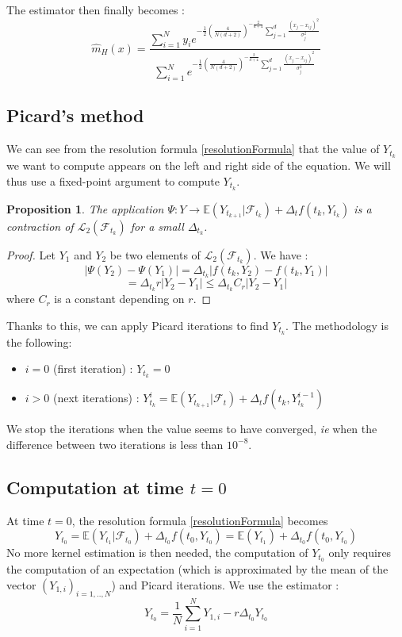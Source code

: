 \documentclass[a4paper,11pt,english]{book}
\newtheorem{prop}{Proposition}
\begin{document}
The estimator then finally becomes :
$$\hat{m}_{H}(x)= \frac{\sum_{i=1}^{N}y_{i}e^{-\frac{1}{2}(\frac{4}{N(d+2)})^{-\frac{2}{d+4}}\sum_{j=1}^{d}\frac{(x_{j}-x_{ij})^{2}}{\sigma_{j}^{2}}}}{\sum_{i=1}^{N}e^{-\frac{1}{2}(\frac{4}{N(d+2)})^{-\frac{2}{d+4}}\sum_{j=1}^{d}\frac{(x_{j}-x_{ij})^{2}}{\sigma_{j}^{2}}}}$$
\subsection{Picard's method}
We can see from the resolution formula \eqref{resolutionFormula} that the value of $Y_{t_{k}}$ we want to compute appears on the left and right side of the equation. We will thus use a fixed-point argument to compute $Y_{t_{k}}$.

\begin{prop}
The application $\Psi : Y \rightarrow \mathbb{E}(Y_{t_{k+1}}|\mathcal{F}_{t_{k}}) + \Delta_{t}f(t_{k},Y_{t_{k}})$ is a contraction of $\mathcal{L}_{2}(\mathcal{F}_{t_{k}})$ for a small $\Delta_{t_{k}}$.
\end{prop}

\begin{proof}
Let $Y_{1}$ and $Y_{2}$ be two elements of $\mathcal{L}_{2}(\mathcal{F}_{t_{k}})$. We have : $$|\Psi(Y_{2})-\Psi(Y_{1})|=\Delta_{t_{k}}|f(t_{k},Y_{2})-f(t_{k},Y_{1})|$$
$$=\Delta_{t_{k}}r |Y_{2}-Y_{1}|\leq \Delta_{t_{k}} C_{r}|Y_{2}-Y_{1}|$$
where $C_{r}$ is a constant depending on $r$.
\end{proof}
Thanks to this, we can apply Picard iterations to find $Y_{t_{k}}$. The methodology is the following:
\begin{itemize}
    \item $i=0$ (first iteration) : $Y_{t_{k}}=0$
    \item $i>0$ (next iterations) : $Y_{t_{k}}^{i}=\mathbb{E}(Y_{t_{k+1}}|\mathcal{F}_{t}) + \Delta_{t}f(t_{k},Y_{t_{k}}^{i-1})$
\end{itemize}
We stop the iterations when the value seems to have converged, \textit{ie} when the difference between two iterations is less than $10^{-8}$.
\subsection{Computation at time $t=0$}
\label{subsec:computation-0}
At time $t=0$, the resolution formula \eqref{resolutionFormula} becomes $$Y_{t_{0}} = \mathbb{E}(Y_{t_{1}}|\mathcal{F}_{t_{0}}) + \Delta_{t_{0}}f(t_{0},Y_{t_{0}})=\mathbb{E}(Y_{t_{1}}) + \Delta_{t_{0}}f(t_{0},Y_{t_{0}})$$
No more kernel estimation is then needed, the computation of $Y_{t_{0}}$ only requires the computation of an expectation (which is approximated by the mean of the vector $(Y_{1,i})_{i=1,..,N}$) and Picard iterations. We use the estimator :
$$Y_{t_{0}} = \frac{1}{N}\sum_{i=1}^{N}Y_{1,i}-r\Delta_{t_{0}}Y_{t_{0}}$$
\end{document}
